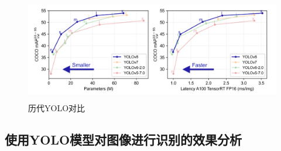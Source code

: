 \begin{figure}[H]
    \centering %
    \includegraphics[height=4.5cm]{../../YOLO/pics/img.png}
    \caption{历代YOLO对比}
\end{figure}


\subsection{使用YOLO模型对图像进行识别的效果分析}